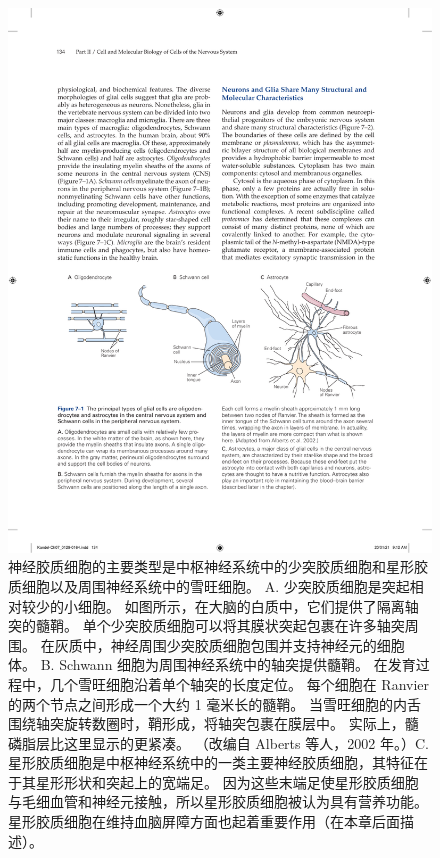 \begin{figure}[htbp]
	\centering
	\includegraphics[width=1.0\linewidth]{chap07/fig_7_1}
	\caption{神经胶质细胞的主要类型是中枢神经系统中的少突胶质细胞和星形胶质细胞以及周围神经系统中的雪旺细胞。
		A. 少突胶质细胞是突起相对较少的小细胞。
		如图所示，在大脑的白质中，它们提供了隔离轴突的髓鞘。
		单个少突胶质细胞可以将其膜状突起包裹在许多轴突周围。 在灰质中，神经周围少突胶质细胞包围并支持神经元的细胞体。 B. Schwann 细胞为周围神经系统中的轴突提供髓鞘。 在发育过程中，几个雪旺细胞沿着单个轴突的长度定位。 每个细胞在 Ranvier 的两个节点之间形成一个大约 1 毫米长的髓鞘。 当雪旺细胞的内舌围绕轴突旋转数圈时，鞘形成，将轴突包裹在膜层中。 实际上，髓磷脂层比这里显示的更紧凑。 （改编自 Alberts 等人，2002 年。）C. 星形胶质细胞是中枢神经系统中的一类主要神经胶质细胞，其特征在于其星形形状和突起上的宽端足。 因为这些末端足使星形胶质细胞与毛细血管和神经元接触，所以星形胶质细胞被认为具有营养功能。 星形胶质细胞在维持血脑屏障方面也起着重要作用（在本章后面描述）。}
	\label{fig:7_1}
\end{figure}


